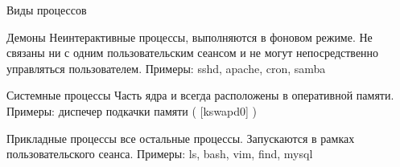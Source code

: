 \begin{frame}{Виды процессов}
  \begin{block}{Демоны}
    Неинтерактивные процессы, выполняются в фоновом режиме. Не связаны ни с одним пользовательским сеансом и не могут непосредственно управляться пользователем. \newline
    Примеры: \alert{sshd}, \alert{apache}, \alert{cron}, \alert{samba}
  \end{block} \pause

  \begin{block}{Системные процессы}
    Часть ядра и всегда расположены в оперативной памяти. \newline
    Примеры: диспечер подкачки памяти ( \alert{[kswapd0]} )
  \end{block} \pause

  \begin{block}{Прикладные процессы}
    все остальные процессы. Запускаются в рамках пользовательского сеанса. \newline
    Примеры: \alert{ls}, \alert{bash}, \alert{vim}, \alert{find}, \alert{mysql}

  \end{block}

\end{frame}

